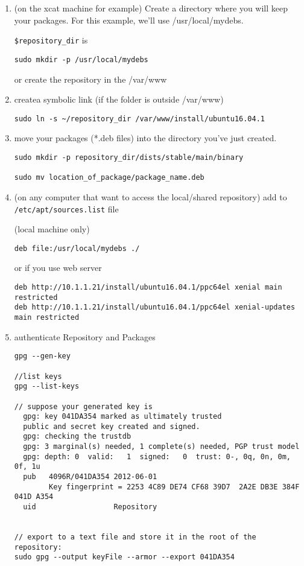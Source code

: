 \begin{enumerate}
  \item (on the xcat machine for example) Create a directory where you will keep
  your packages. For this example, we'll use /usr/local/mydebs.

\verb!$repository_dir! is
\begin{verbatim}
sudo mkdir -p /usr/local/mydebs
\end{verbatim}  
or create the repository in the /var/www

  \item createa symbolic link  (if the folder is outside /var/www)
  
\begin{verbatim}
sudo ln -s ~/repository_dir /var/www/install/ubuntu16.04.1
\end{verbatim}

  \item move your packages (*.deb files) into the directory you've just created.

\begin{verbatim}
sudo mkdir -p repository_dir/dists/stable/main/binary

sudo mv location_of_package/package_name.deb
\end{verbatim}  


  \item (on any computer that want to access the local/shared repository) add to
  \verb!/etc/apt/sources.list! file
  
(local machine only)  
\begin{verbatim}
deb file:/usr/local/mydebs ./
\end{verbatim}

or if you use web server
\begin{verbatim}
deb http://10.1.1.21/install/ubuntu16.04.1/ppc64el xenial main restricted
deb http://10.1.1.21/install/ubuntu16.04.1/ppc64el xenial-updates main restricted

\end{verbatim}


  \item authenticate Repository and Packages

\begin{verbatim}
gpg --gen-key

//list keys
gpg --list-keys

// suppose your generated key is
  gpg: key 041DA354 marked as ultimately trusted
  public and secret key created and signed.
  gpg: checking the trustdb
  gpg: 3 marginal(s) needed, 1 complete(s) needed, PGP trust model
  gpg: depth: 0  valid:   1  signed:   0  trust: 0-, 0q, 0n, 0m, 0f, 1u
  pub   4096R/041DA354 2012-06-01
        Key fingerprint = 2253 4C89 DE74 CF68 39D7  2A2E DB3E 384F 041D A354
  uid                  Repository
  
  
// export to a text file and store it in the root of the repository:
sudo gpg --output keyFile --armor --export 041DA354


\end{verbatim}
\end{enumerate}

